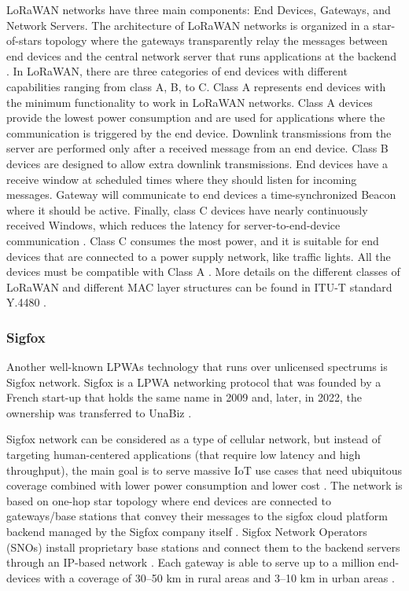\documentclass[]{IEEEtran}
\begin{document}
LoRaWAN networks have three main components: End Devices, Gateways, and Network Servers. The architecture of LoRaWAN networks is organized in a star-of-stars topology where the gateways transparently relay the messages between end devices and the central network server that runs applications at the backend \cite{LoRaWAN_spec}.
In LoRaWAN, there are three categories of end devices with different capabilities ranging from class A, B, to C\cite{ding_iot_2020}. Class A represents end devices with the minimum functionality to work in LoRaWAN networks. Class A devices provide the lowest power consumption
and are used for applications where the communication is triggered by the end device. Downlink transmissions from the server are performed only after a received message from an end device. Class B devices are designed to allow extra downlink transmissions. End devices have a receive window at scheduled times where they should listen for incoming messages. Gateway will communicate to end devices a time-synchronized Beacon where it should be active. Finally, class C devices have nearly continuously received Windows, which reduces the latency for server-to-end-device communication \cite{LoRaWAN_spec}. Class C consumes the most power, and it is suitable for end devices that are connected to a power supply network, like traffic lights. All the devices must be compatible with Class A \cite{haxhibeqiri2018survey}. More details on the different classes of LoRaWAN and different MAC layer structures can be found in ITU-T standard Y.4480 \cite{ITU-T-Y.4480}.

\subsubsection{Sigfox}
\label{sec:2-1-2}
Another well-known LPWAs technology that runs over unlicensed spectrums is Sigfox network. Sigfox is a LPWA networking protocol that was founded by a French start-up that holds the same name in 2009 and, later, in 2022, the ownership was transferred to UnaBiz \cite{grignon_unabiz_2022}. 

Sigfox network can be considered as a type of cellular network, but instead of targeting human-centered applications (that require low latency and high throughput), the main goal is to serve massive IoT use cases that need ubiquitous coverage combined with lower power consumption and lower cost \cite{margelis2015low}.
The network is based on one-hop star topology where end devices are connected to gateways/base stations that convey their messages to the sigfox cloud platform backend managed by the Sigfox company itself \cite{kalfus2016ultra}. Sigfox Network Operators (SNOs) install proprietary base stations and connect them to the backend servers through an IP-based network \cite{raza2017low}. Each gateway is able to serve up to a million end-devices with a coverage of 30–50 km in rural areas and 3–10 km in urban areas \cite{augustin2016study}.
\end{document}
